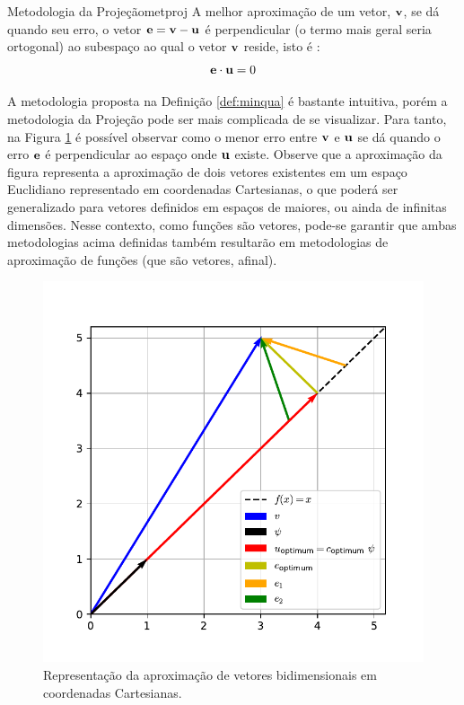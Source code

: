   \begin{Definition}{Metodologia da Projeção}{metproj}
  A melhor aproximação de um vetor, $\bm{\mathrm{v}}$, se dá quando seu erro, o vetor $\bm{\mathrm{e}} =
  \bm{\mathrm{v}} - \bm{\mathrm{u}}$ é perpendicular (o termo mais geral seria ortogonal) ao subespaço ao qual o vetor $\bm{\mathrm{v}}$ reside, isto é :$$ \bm{\mathrm{e}} \cdot \bm{\mathrm{u}} = 0 $$
  \end{Definition}
  
  A metodologia proposta na Definição \ref{def:minqua} é bastante intuitiva,
  porém a metodologia da Projeção pode ser mais complicada de se visualizar.
  Para tanto,  na Figura \ref{fig:2dvecs} é possível observar como o menor erro
  entre  $\bm{\mathrm{v}}$  e  $\bm{\mathrm{u}}$ se dá quando o erro  $\bm{\mathrm{e}}$  é perpendicular ao
  espaço onde  $\bm{\mathrm{u}}$ existe.  Observe que a aproximação da figura representa a
  aproximação de dois vetores existentes em um espaço Euclidiano representado em
  coordenadas Cartesianas, o  que poderá ser generalizado para vetores definidos
  em espaços de maiores, ou ainda de infinitas dimensões. Nesse contexto, como funções são vetores, pode-se garantir que ambas metodologias acima definidas também resultarão em  metodologias de aproximação de funções (que são vetores, afinal).

  \begin{figure}[ht]
	\centering
	\includegraphics[width=\linewidth]{./figures/2dvectors.pdf}
	\caption{Representação da aproximação de vetores bidimensionais em coordenadas
    Cartesianas.  \label{fig:2dvecs}}
  \end{figure}


